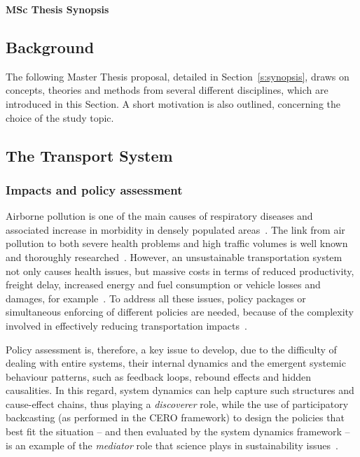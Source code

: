 \documentclass[a4paper,fontsize=10pt,bibliography=totoc]{scrartcl}
\newcommand{\sref}[1]{Section~\ref{#1}}
\newcommand{\titlemake}[1]{%
		\begin{center}
				\Large\sffamily\bfseries{#1}
		\end{center}
}
\newcommand{\subtitlemake}[1]{%
	\begin{center}
		\begingroup
			\large\sffamily{#1}
		\endgroup
	\end{center}
}
\begin{document}
\pagestyle{fancy}
\fancyhf{} %
\rhead{\footnotesize \today}
\rfoot{\footnotesize \thepage}

\titlemake{ %
MSc Thesis Synopsis
}

\begin{multicols*}{2}

\section{Background}
The following Master Thesis proposal, detailed in \sref{s:synopsis}, draws on concepts, theories and methods from several different disciplines, which are introduced in this Section. A short motivation is also outlined, concerning the choice of the study topic.

\subsection{The Transport System}
\subsubsection{Impacts and policy assessment}
Airborne pollution is one of the main causes of respiratory diseases and associated increase in morbidity in densely populated areas~\parencite{vimercati2011airpollutionmorbidity,who2006air}. The link from air pollution to both severe health problems and high traffic volumes is well known and thoroughly researched~\parencite{who2006air}. However, an unsustainable transportation system not only causes health issues, but massive costs in terms of reduced productivity, freight delay, increased energy and fuel consumption or vehicle losses and damages, for example~\parencite{lizeng2012costcongestion}. To address all these issues, policy packages or simultaneous enforcing of different policies are needed, because of the complexity involved in effectively reducing transportation impacts~\parencite[ch. 3, p. 45]{garcia2014travel}.

Policy assessment is, therefore, a key issue to develop, due to the difficulty of dealing with entire systems, their internal dynamics and the emergent systemic behaviour patterns, such as feedback loops, rebound effects and hidden causalities. In this regard, system dynamics can help capture such structures and cause-effect chains, thus playing a \textit{discoverer} role, while the use of participatory backcasting (as performed in the CERO framework) to design the policies that best fit the situation -- and then evaluated by the system dynamics framework -- is an example of the \textit{mediator} role that science plays in sustainability issues~\parencite{ozawa1996science}.


\end{multicols*}
\end{document}
